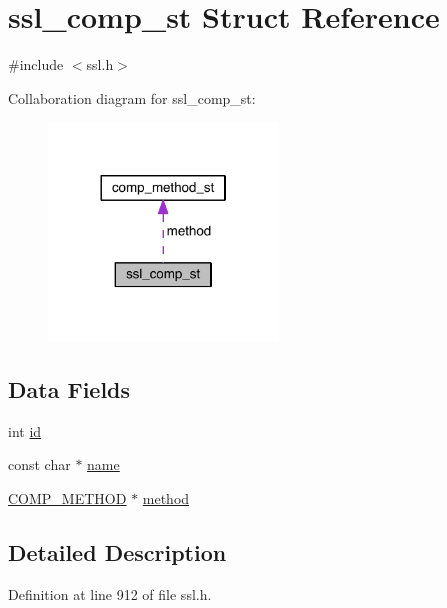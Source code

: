 \hypertarget{structssl__comp__st}{}\section{ssl\+\_\+comp\+\_\+st Struct Reference}
\label{structssl__comp__st}


{\ttfamily \#include $<$ssl.\+h$>$}



Collaboration diagram for ssl\+\_\+comp\+\_\+st\+:\nopagebreak
\begin{figure}[H]
\begin{center}
\leavevmode
\includegraphics[width=173pt]{structssl__comp__st__coll__graph}
\end{center}
\end{figure}
\subsection*{Data Fields}
\begin{DoxyCompactItemize}
\item 
int \hyperlink{structssl__comp__st_a7441ef0865bcb3db9b8064dd7375c1ea}{id}
\item 
const char $\ast$ \hyperlink{structssl__comp__st_afcd1706c9144e6d6eee6127661ae3be2}{name}
\item 
\hyperlink{crypto_2ossl__typ_8h_a9f90390c950298b1f28bfd30c93234ef}{C\+O\+M\+P\+\_\+\+M\+E\+T\+H\+OD} $\ast$ \hyperlink{structssl__comp__st_aa30fcf5a25127ee20b059c94d712b640}{method}
\end{DoxyCompactItemize}


\subsection{Detailed Description}


Definition at line 912 of file ssl.\+h.



